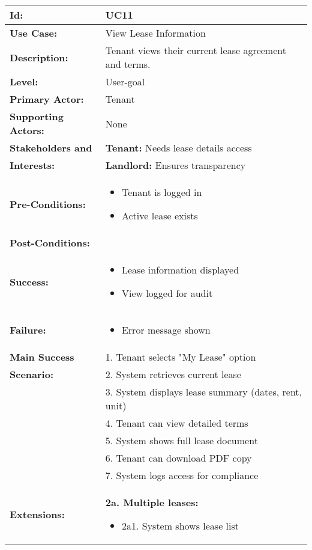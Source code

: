 \documentclass[12pt]{article}
\begin{document}
\begin{longtable}{|p{3cm}|p{11cm}|}
\hline
\textbf{Id:} & UC11 \\
\hline
\textbf{Use Case:} & View Lease Information \\
\hline
\textbf{Description:} & Tenant views their current lease agreement and terms. \\
\hline
\textbf{Level:} & User-goal \\
\hline
\textbf{Primary Actor:} & Tenant \\
\hline
\textbf{Supporting Actors:} & None \\
\hline
\textbf{Stakeholders and} & \textbf{Tenant:} Needs lease details access \\
\textbf{Interests:} & \textbf{Landlord:} Ensures transparency \\
\hline
\textbf{Pre-Conditions:} & 
\begin{itemize}
    \item Tenant is logged in
    \item Active lease exists
\end{itemize} \\
\hline
\textbf{Post-Conditions:} & \\
\textbf{Success:} & 
\begin{itemize}
    \item Lease information displayed
    \item View logged for audit
\end{itemize} \\
\textbf{Failure:} & 
\begin{itemize}
    \item Error message shown
\end{itemize} \\
\hline
\textbf{Main Success} & 1. Tenant selects "My Lease" option \\
\textbf{Scenario:} & 2. System retrieves current lease \\
& 3. System displays lease summary (dates, rent, unit) \\
& 4. Tenant can view detailed terms \\
& 5. System shows full lease document \\
& 6. Tenant can download PDF copy \\
& 7. System logs access for compliance \\
\hline
\textbf{Extensions:} & 
\textbf{2a. Multiple leases:}
\begin{itemize}
    \item 2a1. System shows lease list

\end{itemize}
\end{longtable}
\end{document}
